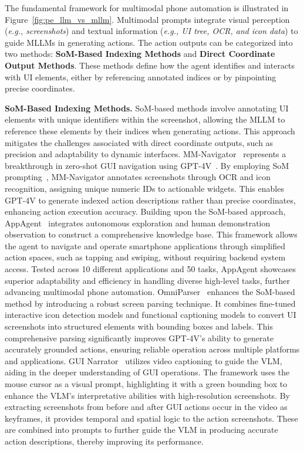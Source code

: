 The fundamental framework for multimodal phone automation is illustrated in Figure~\ref{fig:pe_llm_vs_mllm}. Multimodal prompts integrate visual perception (\textit{e.g., screenshots}) and textual information (\textit{e.g., UI tree, OCR, and icon data}) to guide MLLMs in generating actions. The action outputs can be categorized into two methods: \textbf{SoM-Based Indexing Methods} and \textbf{Direct Coordinate Output Methods}. These methods define how the agent identifies and interacts with UI elements, either by referencing annotated indices or by pinpointing precise coordinates.


\noindent\textbf{SoM-Based Indexing Methods.}
SoM-based methods involve annotating UI elements with unique identifiers within the screenshot, allowing the MLLM to reference these elements by their indices when generating actions. This approach mitigates the challenges associated with direct coordinate outputs, such as precision and adaptability to dynamic interfaces.
MM-Navigator~\cite{yan2023gpt} represents a breakthrough in zero-shot GUI navigation using GPT-4V~\cite{achiam2023gpt}. By employing SoM prompting~\cite{yang2023setofmark}, MM-Navigator annotates screenshots through OCR and icon recognition, assigning unique numeric IDs to actionable widgets. This enables GPT-4V to generate indexed action descriptions rather than precise coordinates, enhancing action execution accuracy.
Building upon the SoM-based approach, AppAgent~\cite{zhang2023appagent} integrates autonomous exploration and human demonstration observation to construct a comprehensive knowledge base. This framework allows the agent to navigate and operate smartphone applications through simplified action spaces, such as tapping and swiping, without requiring backend system access. Tested across 10 different applications and 50 tasks, AppAgent showcases superior adaptability and efficiency in handling diverse high-level tasks, further advancing multimodal phone automation.
OmniParser~\cite{lu2024omniparser} enhances the SoM-based method by introducing a robust screen parsing technique. It combines fine-tuned interactive icon detection models and functional captioning models to convert UI screenshots into structured elements with bounding boxes and labels. This comprehensive parsing significantly improves GPT-4V's ability to generate accurately grounded actions, ensuring reliable operation across multiple platforms and applications.
GUI Narrator~\cite{wu2024gui} utilizes video captioning to guide the VLM, aiding in the deeper understanding of GUI operations. The framework uses the mouse cursor as a visual prompt, highlighting it with a green bounding box to enhance the VLM's interpretative abilities with high-resolution screenshots. By extracting screenshots from before and after GUI actions occur in the video as keyframes, it provides temporal and spatial logic to the action screenshots. These are combined into prompts to further guide the VLM in producing accurate action descriptions, thereby improving its performance.



